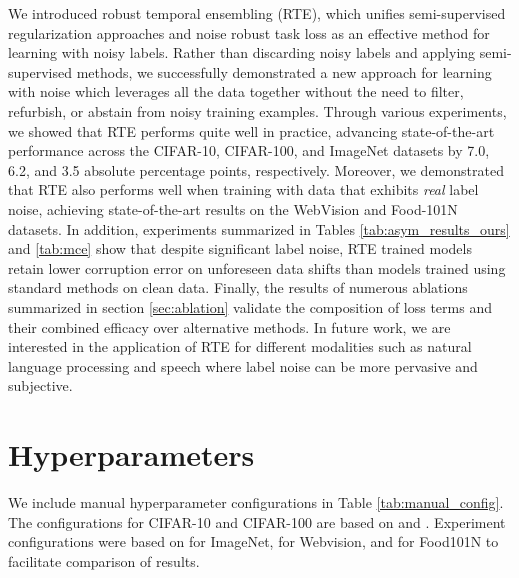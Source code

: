 \documentclass{article}
\begin{document}
We introduced robust temporal ensembling (RTE), which unifies semi-supervised regularization approaches and noise robust task loss as an effective method for learning with noisy labels. Rather than discarding noisy labels and applying semi-supervised methods, we successfully demonstrated a new approach for learning with noise which leverages all the data together without the need to filter, refurbish, or abstain from noisy training examples.  Through various experiments, we showed that RTE performs quite well in practice, advancing state-of-the-art performance across the CIFAR-10, CIFAR-100, and ImageNet datasets by 7.0, 6.2, and 3.5 absolute percentage points, respectively. Moreover, we demonstrated that RTE also performs well when training with data that exhibits \emph{real} label noise, achieving state-of-the-art results on the WebVision and Food-101N datasets. In addition, experiments summarized in Tables \ref{tab:asym_results_ours} and \ref{tab:mce} show that despite significant label noise, RTE trained models retain lower corruption error on unforeseen data shifts than models trained using standard methods on clean data. Finally, the results of numerous ablations summarized in section \ref{sec:ablation} validate the composition of loss terms and their combined efficacy over alternative methods. In future work, we are interested in the application of RTE for different modalities such as natural language processing and speech where label noise can be more pervasive and subjective.








\newpage






















\appendix
\newpage



\section{Hyperparameters}

We include manual hyperparameter configurations in Table \ref{tab:manual_config}.   The configurations for CIFAR-10 and CIFAR-100 are based on \cite{Berthelot2020ReMixMatch:} and \cite{hendrycks2020augmix}. Experiment configurations were based on \cite{hendrycks2020augmix} for ImageNet, \cite{li2020} for Webvision, and \cite{han2019} for Food101N to facilitate comparison of results.
\end{document}
